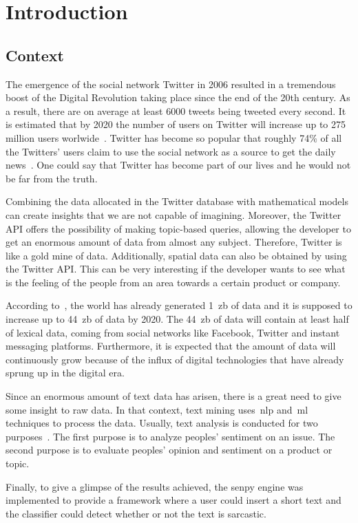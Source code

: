 \chapter{Introduction}

\section{Context}
The emergence of the social network Twitter in 2006 resulted in a tremendous boost of the Digital Revolution taking place since the end of the 20th century. As a result, there are on average at least 6000 tweets being tweeted every second. It is estimated that by 2020 the number of users on Twitter will increase up to 275 million users worlwide~\cite{twitter1}. Twitter has become so popular that roughly 74\% of all the Twitters' users claim to use the social network as a source to get the daily news~\cite{twitter2}. One could say that Twitter has become part of our lives and he would not be far from the truth.\par

 Combining the data allocated in the Twitter database with mathematical models can create insights that we are not capable of imagining. Moreover, the Twitter API offers the possibility of making topic-based queries, allowing the developer to get an enormous amount of data from almost any subject. Therefore, Twitter is like a gold mine of data. Additionally, spatial data can also be obtained by using the Twitter API. This can be very interesting if the developer wants to see what is the feeling of the people from an area towards a certain product or company. \par
According to~\cite{shayaa2018sentiment}, the world has already generated 1~\ac{zb} of data and it is supposed to increase up to 44~\ac{zb} of data by 2020. The 44~\ac{zb} of data will contain at least half of lexical data, coming from social networks like Facebook, Twitter and instant messaging platforms. Furthermore, it is expected that the amount of data will continuously grow because of the influx of digital technologies that have already sprung up in the digital era.\par
Since an enormous amount of text data has arisen, there is a great need to give some insight to raw data. In that context, text mining uses~\ac{nlp} and~\ac{ml} techniques to process the data. Usually, text analysis is conducted for two purposes~\cite{shayaa2018sentiment}. The first purpose is to analyze peoples' sentiment on an issue. The second purpose is to evaluate peoples' opinion and sentiment on a product or topic.\par
Finally, to give a glimpse of the results achieved, the senpy engine was implemented to provide a framework where a user could insert a short text and the classifier could detect whether or not the text is sarcastic.
